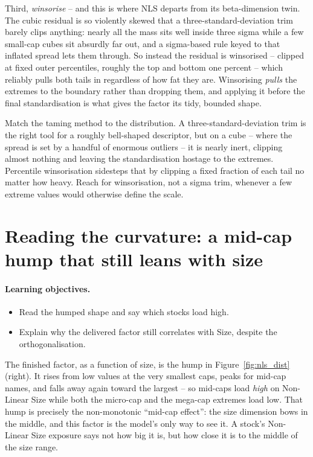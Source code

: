 \documentclass[11pt]{article}
\theoremstyle{definition}
\theoremstyle{plain}
\theoremstyle{remark}
\begin{document}
Third, \emph{winsorise} -- and this is where NLS departs from its beta-dimension twin. The cubic residual is so violently skewed that a three-standard-deviation trim barely clips anything: nearly all the mass sits well inside three sigma while a few small-cap cubes sit absurdly far out, and a sigma-based rule keyed to that inflated spread lets them through. So instead the residual is winsorised -- clipped at fixed outer percentiles, roughly the top and bottom one percent -- which reliably pulls both tails in regardless of how fat they are. Winsorising \emph{pulls} the extremes to the boundary rather than dropping them, and applying it before the final standardisation is what gives the factor its tidy, bounded shape.

\begin{pitfall}
Match the taming method to the distribution. A three-standard-deviation trim is the right tool for a roughly bell-shaped descriptor, but on a cube -- where the spread is set by a handful of enormous outliers -- it is nearly inert, clipping almost nothing and leaving the standardisation hostage to the extremes. Percentile winsorisation sidesteps that by clipping a fixed fraction of each tail no matter how heavy. Reach for winsorisation, not a sigma trim, whenever a few extreme values would otherwise define the scale.
\end{pitfall}

\section{Reading the curvature: a mid-cap hump that still leans with size}\label{sec:curve}

\paragraph{Learning objectives.}
\begin{itemize}[leftmargin=1.4em,topsep=2pt]
  \item Read the humped shape and say which stocks load high.
  \item Explain why the delivered factor still correlates with Size, despite the orthogonalisation.
\end{itemize}

The finished factor, as a function of size, is the hump in Figure~\ref{fig:nls_dist} (right). It rises from low values at the very smallest caps, peaks for mid-cap names, and falls away again toward the largest -- so mid-caps load \emph{high} on Non-Linear Size while both the micro-cap and the mega-cap extremes load low. That hump is precisely the non-monotonic ``mid-cap effect'': the size dimension bows in the middle, and this factor is the model's only way to see it. A stock's Non-Linear Size exposure says not how big it is, but how close it is to the middle of the size range.
\end{document}
